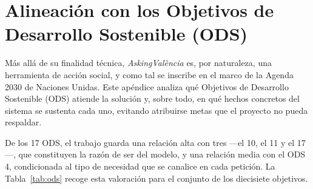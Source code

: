 \documentclass[11pt,oneside,spanish,listoffigures,listoftables]{tfgetsinf}
\begin{document}
\cleardoublepage


\appendix


\chapter{Alineación con los Objetivos de Desarrollo Sostenible (ODS)}
\label{ap:ods}

Más allá de su finalidad técnica, \textit{AskingValència} es, por naturaleza, una herramienta de acción social, y como tal se inscribe en el marco de la Agenda 2030 de Naciones Unidas. Este apéndice analiza qué Objetivos de Desarrollo Sostenible (ODS) atiende la solución y, sobre todo, en qué hechos concretos del sistema se sustenta cada uno, evitando atribuirse metas que el proyecto no pueda respaldar.

De los 17 ODS, el trabajo guarda una relación alta con tres —el 10, el 11 y el 17—, que constituyen la razón de ser del modelo, y una relación media con el ODS 4, condicionada al tipo de necesidad que se canalice en cada petición. La Tabla~\ref{tab:ods} recoge esta valoración para el conjunto de los diecisiete objetivos.
\end{document}
